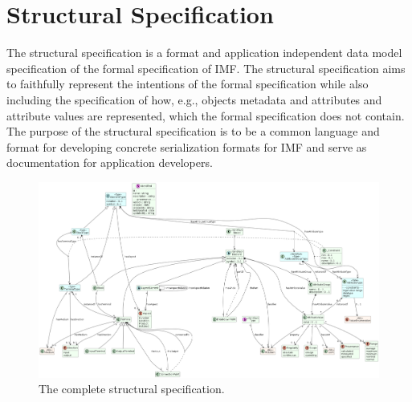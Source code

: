 \chapter{Structural Specification}
\label{ch:Appendix C}
The structural specification is a format and application independent data model
specification of the formal specification of IMF. The structural specification aims to faithfully represent the
intentions of the formal specification while also including the specification of how, e.g., objects metadata and
attributes and attribute values are represented, which the formal specification does not contain. The purpose of the
structural specification is to be a common language and format for developing concrete serialization formats for IMF
and serve as documentation for application developers.

\begin{figure}[htb]
  \centering
  \includegraphics[width=1\textwidth]{img/IMFmanual-img073.png}
  \caption{The complete structural specification.}
  \label{fig:Figure 55}
\end{figure}